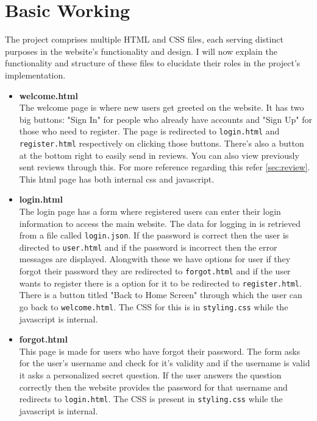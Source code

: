 \documentclass{article}
\begin{document}
\section{Basic Working}
\label{sec:flow}
The project comprises multiple HTML and CSS files, each serving distinct purposes in the website's functionality and design. I will now explain the functionality and structure of these files to elucidate their roles in the project's implementation.
\begin{itemize}
    \item \textbf{welcome.html}\\
   The welcome page is where new users get greeted on the website. It has two big buttons: "Sign In" for people who already have accounts and "Sign Up" for those who need to register. The page is redirected to \texttt{login.html} and \texttt{register.html} respectively on clicking those buttons. There's also a button at the bottom right to easily send in reviews. You can also view previously sent reviews through this. For more reference regarding this refer \ref{sec:review}. This html  page has both internal css and javascript.
  
   \item \textbf{login.html}\\
   The login page has a form where registered users can enter their login information to access the main website. The data for logging in is retrieved from a file called \texttt{login.json}. If the password is correct then the user is directed to \texttt{user.html} and if the password is incorrect then the error messages are displayed. Alongwith these we have options for user if they forgot their password they are redirected to \texttt{forgot.html} and if the user wants to register there is a option for it to be redirected to \texttt{register.html}. There is a button titled "Back to Home Screen" through which the user can go back to \texttt{welcome.html}. The CSS for this is in \texttt{styling.css} while the javascript is internal.
   
   \item \textbf{forgot.html}\\
   This page is made for users who have forgot their password. The form asks for the user's username and check for it's validity and if the username is valid it asks a personalized secret question. If the user answers the question correctly then the website provides the password for that username and redirects to \texttt{login.html}. The CSS is present in \texttt{styling.css} while the javascript is internal.
  

\end{itemize}
\end{document}
